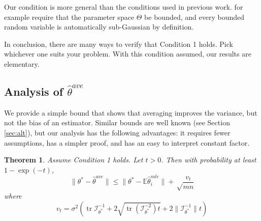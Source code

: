 \documentclass[twoside]{article}
\newtheorem{theorem}{Theorem}
\DeclareMathOperator*{\tr}{tr}
\newcommand{\zero}{\text{\textbf{0}}}
\newcommand{\E}{\mathbb{E}}
\newcommand{\w}{\theta}
\newcommand{\wowa}{\hat\w^{owa}}
\newcommand{\wave}{\hat\w^{ave}}
\newcommand{\wmle}{\hat\w^{mle}}
\newcommand{\wstar}{{\w^{*}}}
\newcommand{\I}{\mathcal I}
\newcommand{\normal}[2]{\ensuremath{\mathcal{N}\left({{#1}},{{#2}}\right)}}
\newcommand{\ltwo}[1]{{\lVert {#1} \rVert}}
\begin{document}
Our condition is more general than the conditions used in previous work.
\cite{zhang2012communication} for example require that the parameter space $\Theta$ be bounded,
and every bounded random variable is automatically sub-Gaussian by definition.

In conclusion,
there are many ways to verify that Condition 1 holds.
Pick whichever one suits your problem.
With this condition assumed, our results are elementary.

\subsection{Analysis of $\wave$}


We provide a simple bound that shows that averaging improves the variance,
but not the bias of an estimator.
Similar bounds are well known (see Section \ref{sec:alt}),
but our analysis has the following advantages:
it requires fewer assumptions, has a simpler proof, and has an easy to interpret constant factor.

\begin{theorem}
\label{thm:wave}
Assume Condition 1 holds.
Let $t>0$.
Then with probability at least $1-\exp(-t)$,
\begin{equation}
\ltwo{\wstar-\wave} \le \ltwo{\wstar-\E\wmle_i} + \sqrt\frac{v_t}{mn}
\end{equation}
where
\begin{equation}
v_t =
\sigma^2
\left(
\tr{\I^{-1}_{\wstar}}
+ 2\sqrt{\tr \left({\I^{-2}_{\wstar}}\right)t}
+ 2\ltwo{\I^{-1}_{\wstar}}t
\right)
\end{equation}
\end{theorem}
\end{document}
